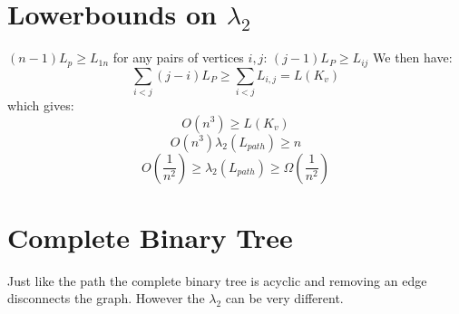 \documentclass[11pt]{article}
\begin{document}
    \section*{Lowerbounds on $\lambda_2$}
    $(n-1)L_p \geq L_{1n}$ for any pairs of vertices $i,j$:
    $(j-1)L_P \geq L_{ij}$
    We then have:
    \[
        \sum_{i<j} (j-i)L_P \geq \sum_{i<j}L_{i,j} = L(K_v)
    \]
    which gives:
    \[
        O(n^3) \geq L(K_v)
    \]
    \[
        O(n^3)\lambda_2(L_{path}) \geq n
    \]
    \[
        O\left(\frac{1}{n^2}\right) \geq \lambda_2{(L_{path})} \geq \Omega\left(\frac{1}{n^2}\right)
    \]
    
    \section*{Complete Binary Tree}
    Just like the path the complete binary tree is acyclic and removing an edge disconnects the graph. However the $\lambda_2$ can be very different.
\end{document}
